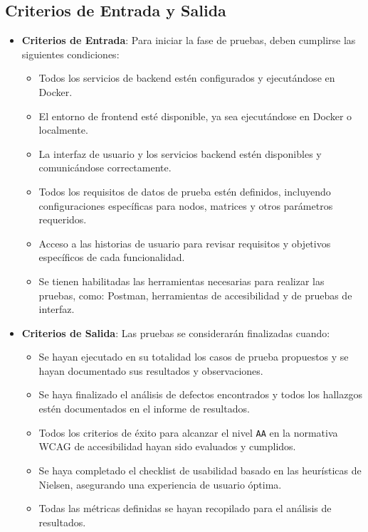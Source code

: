 \documentclass[stu, 12pt, letterpaper, donotrepeattitle, floatsintext, natbib]{apa7}
\begin{document}
\subsection{Criterios de Entrada y Salida}
\begin{itemize}
    \item \textbf{Criterios de Entrada}: Para iniciar la fase de pruebas, deben cumplirse las siguientes condiciones:
    \begin{itemize}
        \item Todos los servicios de backend estén configurados y ejecutándose en Docker.
        \item El entorno de frontend esté disponible, ya sea ejecutándose en Docker o localmente.
        \item La interfaz de usuario y los servicios backend estén disponibles y comunicándose correctamente.
        \item Todos los requisitos de datos de prueba estén definidos, incluyendo configuraciones específicas para nodos, matrices y otros parámetros requeridos.
        \item Acceso a las historias de usuario para revisar requisitos y objetivos específicos de cada funcionalidad.
        \item Se tienen habilitadas las herramientas necesarias para realizar las pruebas, como: Postman, herramientas de accesibilidad y de pruebas de interfaz.
    \end{itemize}
    
    \item \textbf{Criterios de Salida}: Las pruebas se considerarán finalizadas cuando:
    \begin{itemize}
        \item Se hayan ejecutado en su totalidad los casos de prueba propuestos y se hayan documentado sus resultados y observaciones.
        \item Se haya finalizado el análisis de defectos encontrados y todos los hallazgos estén documentados en el informe de resultados.
        \item Todos los criterios de éxito para alcanzar el nivel \texttt{AA} en la normativa WCAG de accesibilidad hayan sido evaluados y cumplidos.
        \item Se haya completado el checklist de usabilidad basado en las heurísticas de Nielsen, asegurando una experiencia de usuario óptima.
        \item Todas las métricas definidas se hayan recopilado para el análisis de resultados.
    \end{itemize}
\end{itemize}
\end{document}
